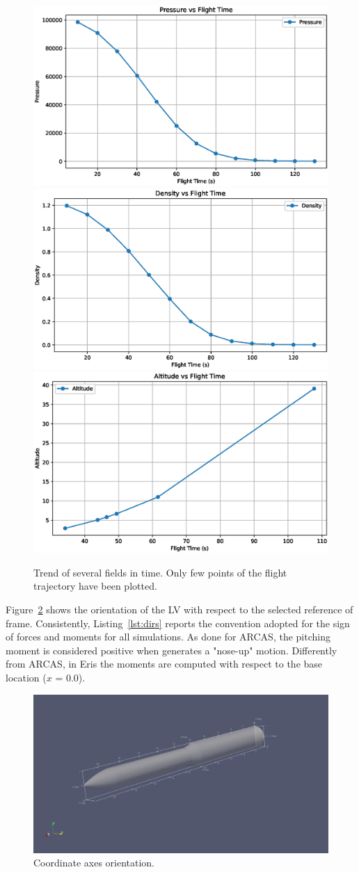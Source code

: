 \documentclass[12pt]{article}
\begin{document}
\begin{figure}[H]
    \includegraphics[width=0.495\linewidth]{figs/eris/S123F/Pressure.eps}\\
    \includegraphics[width=0.495\linewidth]{figs/eris/S123F/Density.eps}
    \includegraphics[width=0.495\linewidth]{figs/eris/S123F/Altitude.eps}
    \caption{Trend of several fields in time. Only few points of the flight trajectory have been plotted.}
    \label{fig:fields}
\end{figure}
%
\noindent Figure~\ref{fig:axes} shows the orientation of the LV with respect to the selected 
reference of frame. Consistently, Listing~\ref{lst:dirs} reports the convention adopted for the
sign of forces and moments for all simulations. As done for ARCAS, the pitching moment is considered positive when generates a "nose-up" motion. Differently from ARCAS, in Eris the moments are computed with respect to the base location ($x$ = 0.0).
%
\begin{figure}[H]
    \centering
    \includegraphics[width=0.99\linewidth]{figs/eris/axis-orientation.png}
    \caption{Coordinate axes orientation.}
    \label{fig:axes}
\end{figure}
\end{document}
